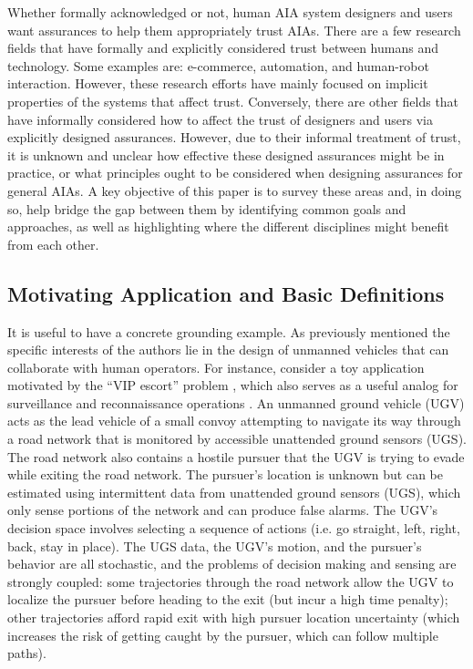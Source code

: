     Whether formally acknowledged or not, human AIA system designers and users want assurances to help them appropriately trust AIAs. There are a few research fields that have formally and explicitly considered trust between humans and technology. Some examples are: e-commerce, automation, and human-robot interaction. However, these research efforts have mainly focused on implicit properties of the systems that affect trust. Conversely, there are other fields that have informally considered how to affect the trust of designers and users via explicitly designed assurances. However, due to their informal treatment of trust, it is unknown and unclear how effective these designed assurances might be in practice, or what principles ought to be considered when designing assurances for general AIAs. A key objective of this paper is to survey these areas and, in doing so, help bridge the gap between them by identifying common goals and approaches, as well as highlighting where the different disciplines might benefit from each other.

\subsection{Motivating Application and Basic Definitions} \label{sec:mot_example}
    It is useful to have a concrete grounding example. As previously mentioned the specific interests of the authors lie in the design of unmanned vehicles that can collaborate with human operators. For instance, consider a toy application motivated by the ``VIP escort'' problem \cite{Humphrey2012-lr}, which also serves as a useful analog for surveillance and reconnaissance operations \cite{Kingston2012-va}.  An unmanned ground vehicle (UGV) acts as the lead vehicle of a small convoy attempting to navigate its way through a road network that is monitored by accessible unattended ground sensors (UGS). The road network also contains a hostile pursuer that the UGV is trying to evade while exiting the road network. %
The pursuer's location is unknown but can be estimated using intermittent data from unattended ground sensors (UGS), which only sense portions of the network and can produce false alarms. The UGV's decision space involves selecting a sequence of actions (i.e. go straight, left, right, back, stay in place). The UGS data, the UGV's motion, and the pursuer's behavior are all stochastic, and the problems of decision making and sensing are strongly coupled: some trajectories through the road network allow the UGV to localize the pursuer before heading to the exit (but incur a high time penalty); other trajectories afford rapid exit with high pursuer location uncertainty (which increases the risk of getting caught by the pursuer, which can follow multiple paths). 

